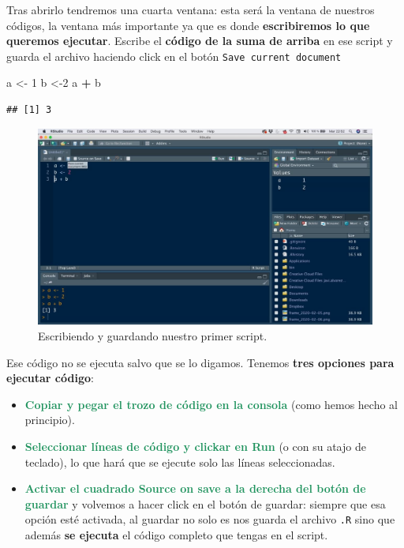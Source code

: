 \documentclass[11pt,]{book}
\newenvironment{Shaded}{\begin{snugshade}}{\end{snugshade}}
\newcommand{\DecValTok}[1]{\textcolor[rgb]{0.06,0.06,0.06}{#1}}
\newcommand{\NormalTok}[1]{#1}
\newcommand{\OperatorTok}[1]{\textcolor[rgb]{0.43,0.43,0.43}{\textbf{#1}}}
\newcommand{\StringTok}[1]{\textcolor[rgb]{0.5,0.5,0.5}{#1}}
\begin{document}
Tras abrirlo tendremos una cuarta ventana: esta será la ventana de nuestros códigos, la ventana más importante ya que es donde \textbf{escribiremos lo que queremos ejecutar}. Escribe el \textbf{código de la suma de arriba} en ese script y guarda el archivo haciendo click en el botón \texttt{Save\ current\ document}

\begin{Shaded}
\begin{Highlighting}[]
\NormalTok{a <-}\StringTok{ }\DecValTok{1}
\NormalTok{b <-}\DecValTok{2}
\NormalTok{a }\OperatorTok{+}\StringTok{ }\NormalTok{b}
\end{Highlighting}
\end{Shaded}

\begin{verbatim}
## [1] 3
\end{verbatim}

\begin{figure}

{\centering \includegraphics[width=0.85\linewidth]{./img/inicio_rstudio_6} 

}

\caption{Escribiendo y guardando nuestro primer script.}\label{fig:inicio-rstudio-6}
\end{figure}

Ese código no se ejecuta salvo que se lo digamos. Tenemos \textbf{tres opciones para ejecutar código}:

\begin{itemize}
\item
  \textbf{\textcolor{#20935E}{Copiar y pegar el trozo de código en la consola}} (como hemos hecho al principio).
\item
  \textbf{\textcolor{#20935E}{Seleccionar líneas de código y clickar en Run}} (o con su atajo de teclado), lo que hará que se ejecute solo las líneas seleccionadas.
\item
  \textbf{\textcolor{#20935E}{Activar el cuadrado Source on save a la derecha del botón de guardar}} y volvemos a hacer click en el botón de guardar: siempre que esa opción esté activada, al guardar no solo es nos guarda el archivo \texttt{.R} sino que además \textbf{se ejecuta} el código completo que tengas en el script.
\end{itemize}
\end{document}
